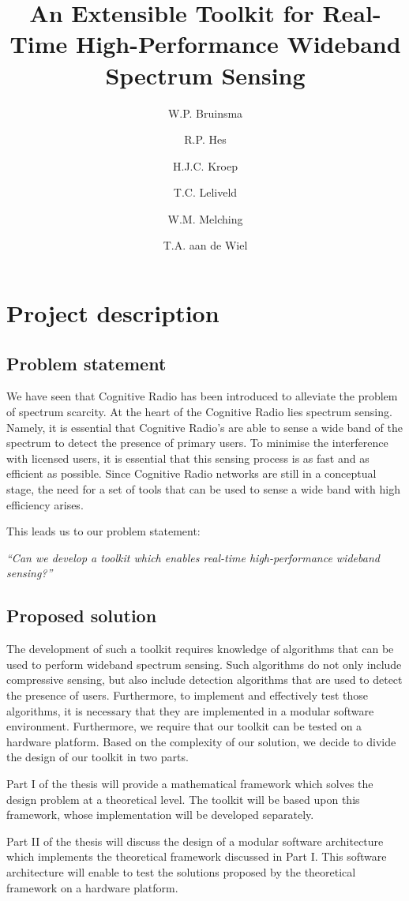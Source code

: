\documentclass[a4paper, openany, oneside]{memoir}
\title{An Extensible Toolkit for Real-Time High-Performance Wideband Spectrum Sensing}
\author{W.P. Bruinsma \and R.P. Hes \and H.J.C. Kroep \and T.C. Leliveld \and W.M. Melching \and T.A. aan de Wiel}
\begin{document}
\chapter{Project description} \label{cha:problem_statement}
\section{Problem statement}

We have seen that Cognitive Radio has been introduced to alleviate the problem of spectrum scarcity.
At the heart of the Cognitive Radio lies spectrum sensing. Namely, it is essential that Cognitive Radio's are able to sense a wide band of the spectrum to detect the presence of primary users. To minimise the interference with licensed users, it is essential that this sensing process is as fast and as efficient as possible. Since Cognitive Radio networks are still in a conceptual stage, the need for a set of tools that can be used to sense a wide band with high efficiency arises.

This leads us to our problem statement:
\begin{center}
\emph{``Can we develop a toolkit which enables real-time high-performance wideband sensing?''}
\end{center}

\section{Proposed solution}
The development of such a toolkit requires knowledge of algorithms that can be used to perform wideband spectrum sensing. Such algorithms do not only include compressive sensing, but also include detection algorithms that are used to detect the presence of users. Furthermore, to implement and effectively test those algorithms, it is necessary that they are implemented in a modular software environment. Furthermore, we require that our toolkit can be tested on a hardware platform. Based on the complexity of our solution, we decide to divide the design of our toolkit in two parts.

Part I of the thesis will provide a mathematical framework which solves the design problem at a theoretical level. The toolkit will be based upon this framework, whose implementation will be developed separately.

Part II of the thesis will discuss the design of a modular software architecture which implements the theoretical framework discussed in Part I. This software architecture will enable to test the solutions proposed by the theoretical framework on a hardware platform.
\end{document}
